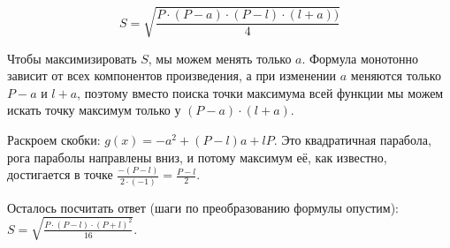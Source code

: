 \begin{itemize}
$$S = \sqrt{\frac{P\cdot(P-a)\cdot(P-l)\cdot(l+a))}{4}}$$

Чтобы максимизировать $S$, мы можем менять только $a$. Формула монотонно зависит от всех компонентов
произведения, а при изменении $a$ меняются только $P-a$ и $l+a$, поэтому вместо поиска точки
максимума всей функции мы можем искать точку максимум только у $(P-a)\cdot(l+a)$.

Раскроем скобки: $g(x) = -a^2 + (P-l)a + lP$. Это квадратичная парабола, рога параболы направлены вниз,
и потому максимум её, как известно, достигается в точке $\frac{-(P-l)}{2\cdot(-1)} = \frac{P-l}{2}$.

Осталось посчитать ответ (шаги по преобразованию формулы опустим): $S = \sqrt{\frac{P\cdot(P-l)\cdot(P+l)^2}{16}}$.

\end{itemize}

